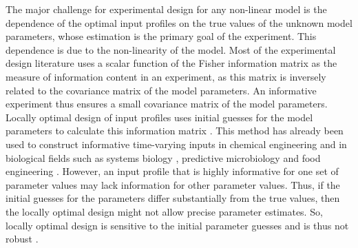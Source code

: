 The major challenge for experimental design for any non-linear model is the dependence of the optimal input profiles on the true values of the unknown model parameters, whose estimation is the primary goal of the experiment. This dependence is due to the non-linearity of the model. Most of the experimental design literature uses a scalar function of the Fisher information matrix as the measure of information content in an experiment, as this matrix is inversely related to the covariance matrix of the model parameters. An informative experiment thus ensures a small covariance matrix of the model parameters. Locally optimal design of input profiles uses initial guesses for the model parameters to calculate this information matrix \parencite{fedorov}. This method has already been used to construct informative time-varying inputs in chemical engineering \parencite{franceschini} and in biological fields such as systems biology \parencite{balsa1}, predictive microbiology \parencite{bernaerts1,bernaerts2} and food engineering \parencite{balsa2,nahor}. However, an input profile that is highly informative for one set of parameter values may lack information for other parameter values. Thus, if the initial guesses {\color{red}for} the parameters differ substantially from the true values, then the {\color{red}locally optimal design} might not allow precise parameter estimates. So, locally optimal design is sensitive to the initial parameter guesses and is thus not robust {\color{red}\parencite{asprey}}.
\\
\\
